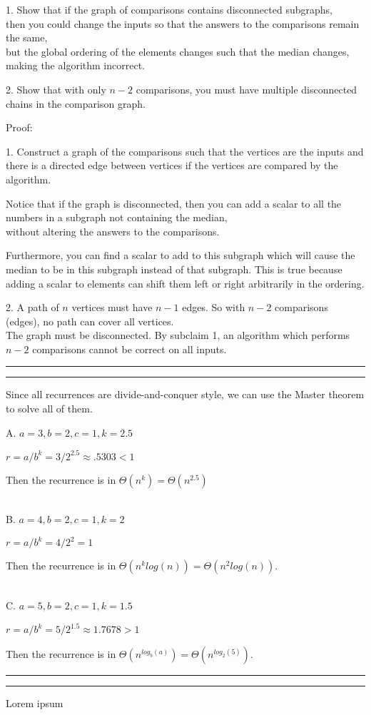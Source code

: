 \documentclass[11pt,letterpaper]{article}
\newcommand{\question}[1] {\vspace{.25in} \hrule\vspace{0.5em}
\noindent{\bf #1} \vspace{0.5em}
\hrule \vspace{.10in}}
\begin{document}
1. Show that if the graph of comparisons contains disconnected subgraphs,\\
then you could change the inputs so that the answers to the comparisons remain the same,\\
but the global ordering of the elements changes such that the median changes, making the algorithm incorrect.

2. Show that with only $n-2$ comparisons, you must have multiple disconnected chains in the comparison graph.

Proof:

1. Construct a graph of the comparisons such that the vertices are the inputs and there is a directed edge
between vertices if the vertices are compared by the algorithm.

Notice that if the graph is disconnected, then you can add a scalar to all the numbers in a subgraph not containing the median, \\
without altering the answers to the comparisons.

Furthermore, you can find a scalar to add to this subgraph which will cause the median to be in this subgraph instead of that subgraph.
This is true because adding a scalar to elements can shift them left or right arbitrarily in the ordering.

2. A path of $n$ vertices must have $n-1$ edges. So with $n-2$ comparisons (edges), no path can cover all vertices.\\
The graph must be disconnected. By subclaim 1, an algorithm which performs $n-2$ comparisons cannot be correct on all inputs.

\question{1d.}
Since all recurrences are divide-and-conquer style, we can use the Master theorem to solve all of them.

A. $a=3, b=2, c=1, k=2.5$

$r = a/b^{k} = 3/2^{2.5} \approx .5303 < 1$

Then the recurrence is in $\Theta(n^k) = \Theta(n^{2.5})$

\\

B. $a=4, b=2, c=1, k=2$

$r = a/b^{k} = 4/2^{2} = 1$

Then the recurrence is in $\Theta(n^k log(n)) = \Theta(n^{2} log(n))$.

\\

C. $a=5, b=2, c=1, k=1.5$

$r = a/b^{k} = 5/2^{1.5} \approx 1.7678 > 1$

Then the recurrence is in $\Theta(n^{log_b(a)}) = \Theta(n^{log_2(5)})$.


\question{2}
Lorem ipsum
\end{document}
